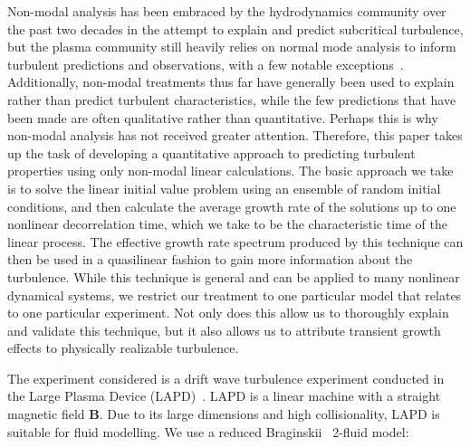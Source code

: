 \documentclass[showpacs,preprintnumbers,amsmath,amssymb,superscriptaddress,aip]{revtex4-1}
\begin{document}
Non-modal analysis has been embraced by the hydrodynamics community over the past two decades in the attempt to explain and predict subcritical turbulence, but the plasma community
still heavily relies on normal mode analysis to inform turbulent predictions and observations, with a few notable exceptions~\cite{camargo1998,camporeale2010,schekochihin2012}. 
Additionally, non-modal treatments thus far have generally been used to explain rather than predict turbulent characteristics, 
while the few predictions that have been made are often qualitative rather than quantitative. Perhaps this is why non-modal analysis has not received greater attention.
Therefore, this paper takes up the task of developing a quantitative approach to predicting turbulent properties using only non-modal linear calculations. 
The basic approach we take is to solve the linear initial value problem using an ensemble of random initial conditions, 
and then calculate the average growth rate of the solutions up to one nonlinear decorrelation time, which we take to be the characteristic time of the linear process. 
The effective growth rate spectrum produced by this technique can then be used in a quasilinear fashion to gain more information about the turbulence.
While this technique is general and can be applied to many nonlinear dynamical systems, we restrict our treatment to one particular model that relates to one particular experiment. Not only does
this allow us to thoroughly explain and validate this technique, but it also allows us to attribute transient growth effects to physically realizable turbulence.

The experiment considered is a drift wave turbulence experiment conducted in the Large Plasma Device (LAPD)~\cite{gekelman1991}. LAPD is a linear machine with a straight magnetic field $\mathbf{B}$.
Due to its large dimensions and high collisionality, LAPD is suitable for fluid modelling. We use a reduced Braginskii~\cite{Braginskii1965} 2-fluid model:
\end{document}
